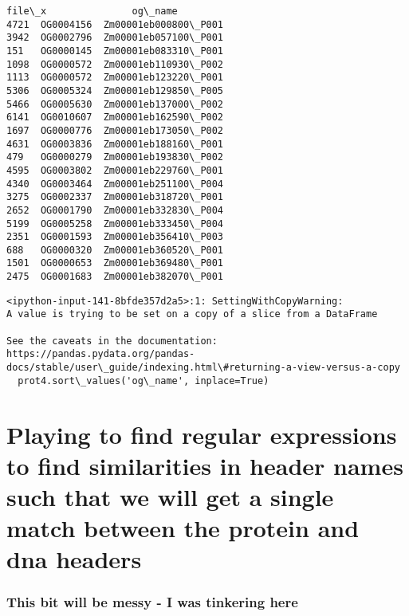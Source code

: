 \documentclass[11pt]{article}
\begin{document}
    \begin{Verbatim}[commandchars=\\\{\}]
         file\_x               og\_name
4721  OG0004156  Zm00001eb000800\_P001
3942  OG0002796  Zm00001eb057100\_P001
151   OG0000145  Zm00001eb083310\_P001
1098  OG0000572  Zm00001eb110930\_P002
1113  OG0000572  Zm00001eb123220\_P001
5306  OG0005324  Zm00001eb129850\_P005
5466  OG0005630  Zm00001eb137000\_P002
6141  OG0010607  Zm00001eb162590\_P002
1697  OG0000776  Zm00001eb173050\_P002
4631  OG0003836  Zm00001eb188160\_P001
479   OG0000279  Zm00001eb193830\_P002
4595  OG0003802  Zm00001eb229760\_P001
4340  OG0003464  Zm00001eb251100\_P004
3275  OG0002337  Zm00001eb318720\_P001
2652  OG0001790  Zm00001eb332830\_P004
5199  OG0005258  Zm00001eb333450\_P004
2351  OG0001593  Zm00001eb356410\_P003
688   OG0000320  Zm00001eb360520\_P001
1501  OG0000653  Zm00001eb369480\_P001
2475  OG0001683  Zm00001eb382070\_P001
    \end{Verbatim}

    \begin{Verbatim}[commandchars=\\\{\}]
<ipython-input-141-8bfde357d2a5>:1: SettingWithCopyWarning:
A value is trying to be set on a copy of a slice from a DataFrame

See the caveats in the documentation: https://pandas.pydata.org/pandas-
docs/stable/user\_guide/indexing.html\#returning-a-view-versus-a-copy
  prot4.sort\_values('og\_name', inplace=True)
    \end{Verbatim}

    \hypertarget{playing-to-find-regular-expressions-to-find-similarities-in-header-names-such-that-we-will-get-a-single-match-between-the-protein-and-dna-headers}{%
\section{Playing to find regular expressions to find similarities in
header names such that we will get a single match between the protein
and dna
headers}\label{playing-to-find-regular-expressions-to-find-similarities-in-header-names-such-that-we-will-get-a-single-match-between-the-protein-and-dna-headers}}

    \hypertarget{this-bit-will-be-messy---i-was-tinkering-here}{%
\subsubsection{This bit will be messy - I was tinkering
here}\label{this-bit-will-be-messy---i-was-tinkering-here}}
\end{document}
